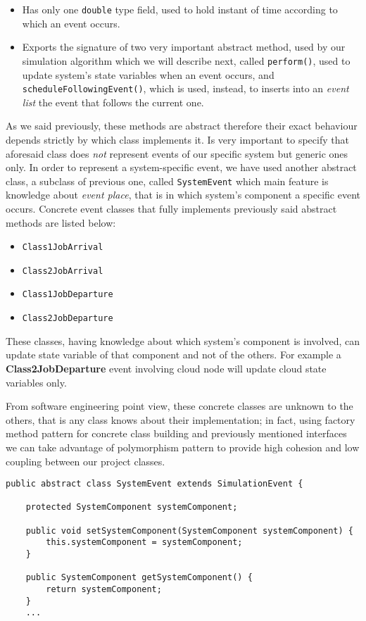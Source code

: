 \documentclass[10pt,a4paper]{article}
\begin{document}
\begin{itemize}
\item Has only one \texttt{double} type field, used to hold instant of time according to which an event occurs.
\item Exports the signature of two very important abstract method, used by our simulation algorithm which we will describe next, called \texttt{perform()}, used to update system's state variables when an event occurs, and \texttt{scheduleFollowingEvent()}, which is used, instead, to inserts into an \textit{event list} the event that follows the current one.
\end{itemize}

As we said previously, these methods are abstract therefore their exact behaviour depends strictly by which class implements it. Is very important to specify that aforesaid class does \textit{not} represent events of our specific system but generic ones only. In order to represent a system-specific event, we have used another abstract class, a subclass of previous one, called \texttt{SystemEvent} which main feature is knowledge about \textit{event place}, that is in which system's component a specific event occurs. Concrete event classes that fully implements previously said abstract methods are listed below:

\begin{itemize}
\item \texttt{Class1JobArrival}
\item \texttt{Class2JobArrival}
\item \texttt{Class1JobDeparture}
\item \texttt{Class2JobDeparture}
\end{itemize}

These classes, having knowledge about which system's component is involved, can update state variable of that component and not of the others. For example a \textbf{Class2JobDeparture} event involving cloud node will update cloud state variables only. 

From software engineering point view, these concrete classes are unknown to the others, that is any class knows about their implementation; in fact, using factory method pattern for concrete class building and previously mentioned interfaces we can take advantage of polymorphism pattern to provide high cohesion and low coupling between our project classes.

\begin{lstlisting}[frame=lines, caption={Implementazione della funzione \texttt{start\_server}}, label={code:serverStart}]
public abstract class SystemEvent extends SimulationEvent {

    protected SystemComponent systemComponent;

    public void setSystemComponent(SystemComponent systemComponent) {
        this.systemComponent = systemComponent;
    }

    public SystemComponent getSystemComponent() {
        return systemComponent;
    }
    ...
\end{lstlisting}
\end{document}
